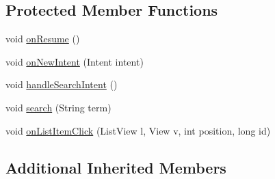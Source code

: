 \subsection*{Protected Member Functions}
\begin{DoxyCompactItemize}
\item 
void \hyperlink{classcom_1_1zia_1_1freshdocs_1_1activity_1_1_search_activity_a091b93049c30925d995244dd5253db4a}{on\-Resume} ()
\item 
void \hyperlink{classcom_1_1zia_1_1freshdocs_1_1activity_1_1_search_activity_ad5329aa3f98d13534a50a96fea198caf}{on\-New\-Intent} (Intent intent)
\item 
void \hyperlink{classcom_1_1zia_1_1freshdocs_1_1activity_1_1_search_activity_a068fcffe2b3bf9f56d6cf8003abc4071}{handle\-Search\-Intent} ()
\item 
void \hyperlink{classcom_1_1zia_1_1freshdocs_1_1activity_1_1_search_activity_aec7d49508638d8b7fc5d1af0d04ba9af}{search} (String term)
\item 
void \hyperlink{classcom_1_1zia_1_1freshdocs_1_1activity_1_1_search_activity_a94253ac341cfd40ffa426de71cdd7cf2}{on\-List\-Item\-Click} (List\-View l, View v, int position, long id)
\end{DoxyCompactItemize}
\subsection*{Additional Inherited Members}


